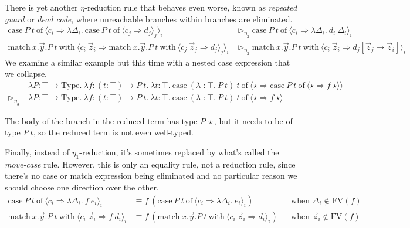 \documentclass{report}
\newcommand{\const}[1]{\text{#1}}
\newcommand{\meta}[1]{\text{#1}}
\newcommand{\Type}{\const{Type}}
\newcommand{\case}{\const{case}}
\newcommand{\of}{\const{of}}
\newcommand{\match}{\const{match}}
\newcommand{\with}{\const{with}}
\begin{document}
There is yet another $\eta$-reduction rule that behaves even worse, known as \emph{repeated guard} or \emph{dead code}, where unreachable branches within branches are eliminated.
%
\begin{align*}
    \case ~ P ~ t ~ \of ~ \langle c_i \Rightarrow \lambda \Delta_i. ~ \case ~ P ~ t ~ \of ~ \langle c_j \Rightarrow d_j \rangle_j \rangle_i &\rhd_{\eta_3} \case ~ P ~ t ~ \of ~ \langle c_i \Rightarrow \lambda \Delta_i. ~ d_i ~ \Delta_i \rangle_i \\
    \match ~ x.\Vec{y}.P ~ t ~ \with ~ \langle c_i ~ \Vec{z}_i \Rightarrow \match ~ x.\Vec{y}.P ~ t ~ \with ~ \langle c_j ~ \Vec{z}_j \Rightarrow d_j \rangle_j \rangle_i &\rhd_{\eta_3} \match ~ x.\Vec{y}.P ~ t ~ \with ~ \langle c_i ~ \Vec{z}_i \Rightarrow d_j[\Vec{z}_j \mapsto \Vec{z}_i] \rangle_i
\end{align*}
We examine a similar example but this time with a nested case expression that we collapse.
\begin{align*}
    &\lambda P: \top \to \Type. ~ \lambda f: (t: \top) \to P ~ t. ~ \lambda t: \top. ~ \case ~ (\lambda \_: \top. ~ P ~ t) ~ t ~ \of ~ \langle \star \Rightarrow \case ~ P ~ t ~ \of ~ \langle \star \Rightarrow f ~ \star \rangle \rangle \\
    \rhd_{\eta_3} ~ &\lambda P: \top \to \Type. ~ \lambda f: (t: \top) \to P ~ t. ~ \lambda t: \top. ~ \case ~ (\lambda \_: \top. ~ P ~ t) ~ t ~ \of ~ \langle \star \Rightarrow f ~ \star \rangle
\end{align*}

The body of the branch in the reduced term has type $P ~ \star$, but it needs to be of type $P ~ t$, so the reduced term is not even well-typed.

Finally, instead of $\eta_1$-reduction, it's sometimes replaced by what's called the \emph{move-case} rule. However, this is only an equality rule, not a reduction rule, since there's no case or match expression being eliminated and no particular reason we should choose one direction over the other.
%
\begin{align*}
    \case ~ P ~ t ~ \of ~ \langle c_i \Rightarrow \lambda \Delta_i. ~ f ~ e_i \rangle_i &\equiv f ~ (\case ~ P ~ t ~ \of ~ \langle c_i \Rightarrow \lambda \Delta_i. ~ e_i \rangle_i) &&\text{when $\Delta_i \notin \meta{FV}(f)$} \\
    \match ~ x.\Vec{y}.P ~ t ~ \with ~ \langle c_i ~ \Vec{z}_i \Rightarrow f ~ d_i \rangle_i &\equiv f ~ (\match ~ x.\Vec{y}.P ~ t ~ \with ~ \langle c_i ~ \Vec{z}_i \Rightarrow d_i \rangle_i) &&\text{when $\Vec{z}_i \notin \meta{FV}(f)$}
\end{align*}
\fi
\end{document}
